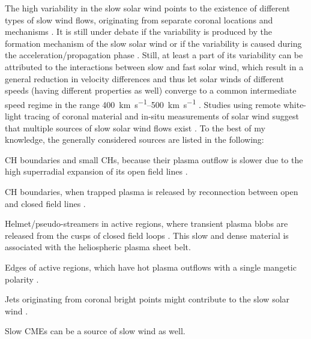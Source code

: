 The high variability in the slow solar wind points to the existence of different types of slow wind flows, originating from separate coronal locations and mechanisms \citep{Schwenn1983}. It is still under debate if the variability is produced by the formation mechanism of the slow solar wind or if the variability is caused during the acceleration/propagation phase \citep{Sanchez-Diaz2016}. Still, at least a part of its variability can be attributed to the interactions between slow and fast solar wind, which result in a general reduction in velocity differences and thus let solar winds of different speeds (having different properties as well) converge to a common intermediate speed regime in the range \SIrange{400}{500}{\km\per\s} \citep{McGregor2011a,Sanchez-Diaz2016}. Studies using remote white-light tracing of coronal material and in-situ measurements of solar wind suggest that multiple sources of slow solar wind flows exist \citep{Wang2000,Kilpua2016}. To the best of my knowledge, the generally considered sources are listed in the following:
\begin{itemize*}
	\item CH boundaries and small CHs, because their plasma outflow is slower due to the high superradial expansion of its open field lines \citep{Wang1990}.
	\item CH boundaries, when trapped plasma is released by reconnection between open and closed field lines \citep{Madjarska2004}.
	\item Helmet/pseudo-streamers in active regions, where transient plasma blobs are released from the cusps of closed field loops \citep{Wang1998,Wang2000}. This slow and dense material is associated with the heliospheric plasma sheet belt.
	\item Edges of active regions, which have hot plasma outflows with a single mangetic polarity \citep{Kojima1999}.
	\item Jets originating from coronal bright points might contribute to the slow solar wind \citep{Subramanian2010}.
	\item Slow CMEs can be a source of slow wind as well.
\end{itemize*}

